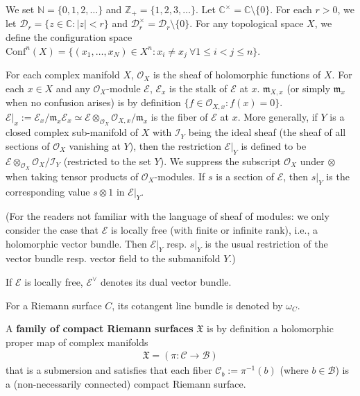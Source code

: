 \documentclass[12pt,a4paper,notitlepage]{article}
\theoremstyle{definition}
\theoremstyle{plain}
\newcommand{\fk}{\mathfrak}
\newcommand{\mc}{\mathcal}
\newcommand{\Conf}{\mathrm{Conf}}
\newcommand{\scr}{\mathscr}
\newcommand{\Cbb}{\mathbb C}
\newcommand{\Nbb}{\mathbb N}
\newcommand{\Zbb}{\mathbb Z}
\numberwithin{equation}{section}
\begin{document}
We set $\Nbb=\{0,1,2,\dots\}$ and $\Zbb_+=\{1,2,3,\dots\}$. Let $\Cbb^\times=\Cbb\setminus\{0\}$. \index{C@$\Cbb^\times$} For each $r>0$, we let $\mc D_r=\{z\in\Cbb:|z|<r\}$ and $\mc D_r^\times=\mc D_r\setminus\{0\}$. \index{Dr@$\mc D_r,\mc D_r^\times$} For any topological space $X$, we define the configuration space $\Conf^n(X)=\{(x_1,\dots,x_N)\in X^n:x_i\neq x_j~\forall 1\leq i<j\leq n\}$. \index{Conf@$\Conf^n(X)$}

For each complex manifold $X$, $\scr O_X$ is the sheaf of holomorphic functions of $X$. For each $x\in X$ and any $\scr O_X$-module $\scr E$, $\scr E_x$ is the stalk of $\scr E$ at $x$. $\fk m_{X,x}$ (or simply $\fk m_x$ when no confusion arises)  is by definition $\{f\in\scr O_{X,x}:f(x)=0\}$. $\scr E|_x:=\scr E_x/\fk m_x\scr E_x\simeq\scr E\otimes_{\scr O_X}\scr O_{X,x}/\fk m_x$ is the fiber of $\scr E$ at $x$. More generally, if $Y$ is a closed complex sub-manifold of $X$ with $\scr I_Y$ being the ideal sheaf (the sheaf of all sections of $\scr O_X$ vanishing at $Y$), then the restriction $\scr E|_Y$ is defined to be $\scr E\otimes_{\scr O_X}\scr O_X/\scr I_Y$ (restricted to the set $Y$). We suppress the subscript $\scr O_X$ under $\otimes$ when taking tensor products of $\scr O_X$-modules. If $s$ is a section of $\scr E$, then $s|_Y$ is the corresponding value $s\otimes 1$ in $\scr E|_Y$. 


(For the readers not familiar with the language of sheaf of modules: we only consider the case that $\scr E$ is locally free (with finite or infinite rank), i.e., a holomorphic vector bundle. Then $\scr E|_Y$ resp. $s|_Y$ is the usual restriction of the vector bundle resp. vector field to the submanifold $Y$.)

If $\scr E$ is locally free, $\scr E^\vee$ denotes its dual vector bundle.

For a Riemann surface $C$, its cotangent line bundle is denoted by $\omega_C$. \index{zz@$\omega_C$, $\omega_{\mc C_b}$}

A \textbf{family of compact Riemann surfaces} $\fk X$ is by definition a holomorphic proper  map of complex manifolds
\begin{align*}
\fk X=(\pi:\mc C\rightarrow\mc B)	
\end{align*}
that is a submersion and satisfies that each fiber $\mc C_b:=\pi^{-1}(b)$ (where $b\in\mc B$) is a (non-necessarily connected) compact Riemann surface.  

\end{document}
